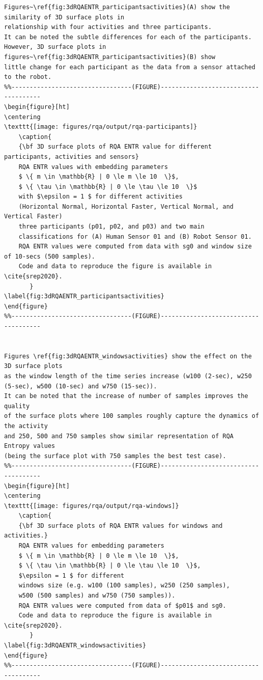 \documentclass[10pt]{article}
\begin{document}
\begin{enumerate}
\begin{verbatim}
Figures~\ref{fig:3dRQAENTR_participantsactivities}(A) show the similarity of 3D surface plots in 
relationship with four activities and three participants. 
It can be noted the subtle differences for each of the participants. 
However, 3D surface plots in figures~\ref{fig:3dRQAENTR_participantsactivities}(B) show 
little change for each participant as the data from a sensor attached to the robot. 
%%---------------------------------(FIGURE)-------------------------------------
\begin{figure}[ht]
\centering
\texttt{[image: figures/rqa/output/rqa-participants]}
    \caption{
	{\bf 3D surface plots of RQA ENTR value for different participants, activities and sensors}
	RQA ENTR values with embedding parameters
	$ \{ m \in \mathbb{R} | 0 \le m \le 10  \}$,
	$ \{ \tau \in \mathbb{R} | 0 \le \tau \le 10  \}$
	with $\epsilon = 1 $ for different activities 
	(Horizontal Normal, Horizontal Faster, Vertical Normal, and Vertical Faster) 
	three participants (p01, p02, and p03) and two main 
	classifications for (A) Human Sensor 01 and (B) Robot Sensor 01.
	RQA ENTR values were computed from data with sg0 and window size of 10-secs (500 samples).
	Code and data to reproduce the figure is available in \cite{srep2020}.
       }
\label{fig:3dRQAENTR_participantsactivities}
\end{figure}
%%---------------------------------(FIGURE)-------------------------------------


Figures \ref{fig:3dRQAENTR_windowsactivities} show the effect on the 3D surface plots
as the window length of the time series increase (w100 (2-sec), w250 (5-sec), w500 (10-sec) and w750 (15-sec)).
It can be noted that the increase of number of samples improves the quality 
of the surface plots where 100 samples roughly capture the dynamics of the activity
and 250, 500 and 750 samples show similar representation of RQA Entropy values 
(being the surface plot with 750 samples the best test case).
%%---------------------------------(FIGURE)-------------------------------------
\begin{figure}[ht]
\centering
\texttt{[image: figures/rqa/output/rqa-windows]}
    \caption{
	{\bf 3D surface plots of RQA ENTR values for windows and activities.}
	RQA ENTR values for embedding parameters
	$ \{ m \in \mathbb{R} | 0 \le m \le 10  \}$,
	$ \{ \tau \in \mathbb{R} | 0 \le \tau \le 10  \}$, 
	$\epsilon = 1 $ for different 
	windows size (e.g. w100 (100 samples), w250 (250 samples),
	w500 (500 samples) and w750 (750 samples)).
	RQA ENTR values were computed from data of $p01$ and sg0.
	Code and data to reproduce the figure is available in \cite{srep2020}.
       }
\label{fig:3dRQAENTR_windowsactivities}
\end{figure}
%%---------------------------------(FIGURE)-------------------------------------









\end{verbatim}
\end{enumerate}
\end{document}
